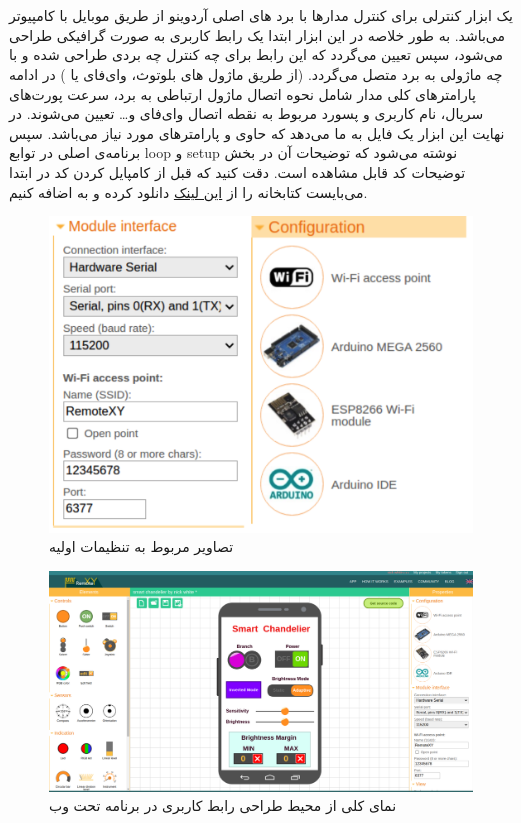 \documentclass[12pt,a4paper]{article}
\begin{document}
	\section{}
	 یک ابزار کنترلی برای کنترل مدارها با برد های اصلی آردوینو از طریق موبایل با کامپیوتر می‌باشد. به طور خلاصه در این ابزار ابتدا یک رابط کاربری به صورت گرافیکی طراحی می‌شود، سپس تعیین می‌گردد که این رابط برای چه کنترل چه بردی طراحی شده و با چه ماژولی به برد متصل می‌گردد. (از طریق ماژول های بلوتوث، وای‌فای یا ) در ادامه پارامتر‌های کلی مدار شامل نحوه اتصال ماژول ارتباطی به برد، سرعت پورت‌های سریال، نام کاربری و پسورد مربوط به نقطه اتصال وای‌فای و… تعیین می‌شوند. در نهایت این ابزار یک فایل  به ما می‌دهد که حاوی   و پارامتر‌های مورد نیاز می‌باشد. سپس برنامه‌ی اصلی در توابع loop و setup نوشته می‌شود که توضیحات آن در بخش توضیحات کد قابل مشاهده است. دقت کنید که قبل از کامپایل کردن کد در  ابتدا می‌بایست کتابخانه  را از  
	 \href{https://remotexy.com/en/library/}{این لینک}
	 دانلود کرده و به  اضافه کنیم.
	 \begin{figure}[H]
	 	\centering
	 	\includegraphics[scale=0.3]{figs/initial-conf.png}
	 	\caption{
	 	تصاویر مربوط به تنظیمات اولیه
	 	}
	 	\label{fig:schema1}
	 \end{figure}
 
 	 \begin{figure}[H]
 	\centering
 	\includegraphics[scale=0.2]{figs/initial-conf-nama.png}
 	\caption{
 		نمای کلی از محیط طراحی رابط کاربری در برنامه تحت وب 
 	}
 	\label{fig:schema1}
 \end{figure}
\end{document}
